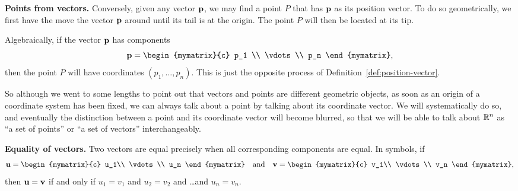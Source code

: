 \noindent\textbf{Points from vectors.} Conversely, given any vector
$\vect{p}$, we may find a point $P$ that has $\vect{p}$ as its
position vector. To do so geometrically, we first have the move the
vector $\vect{p}$ around until its tail is at the origin. The point
$P$ will then be located at its tip.
\begin{center}
\end{center}
Algebraically, if the vector $\vect{p}$ has components
\begin{equation*}
  \vect{p} =
  \begin{mymatrix}{c}
    p_1    \\
    \vdots \\
    p_n
  \end{mymatrix},
\end{equation*}
then the point $P$ will have coordinates $(p_1,\ldots,p_n)$. This is
just the opposite process of Definition~\ref{def:position-vector}.

So although we went to some lengths to point out that vectors and
points are different geometric objects, as soon as an origin of a
coordinate system has been fixed, we can always talk about a point by
talking about its coordinate vector. We will systematically do so, and
eventually the distinction between a point and its coordinate vector
will become blurred, so that we will be able to talk about $\mathbb{R}^n$ as
``a set of points'' or ``a set of vectors'' interchangeably.  \bigskip

\noindent\textbf{Equality of vectors.}
Two vectors are equal%
 precisely when all corresponding components are
equal. In symbols, if
\begin{equation*}
  \vect{u} =
  \begin{mymatrix}{c}
    u_1\\
    \vdots\\
    u_n
  \end{mymatrix}
  \quad\mbox{and}\quad
  \vect{v} =
  \begin{mymatrix}{c}
    v_1\\
    \vdots\\
    v_n
  \end{mymatrix},
\end{equation*}
then $\vect{u}=\vect{v}$ if and only if $u_1=v_1$ and $u_2=v_2$ and
\ldots and $u_n=v_n$.
\bigskip

